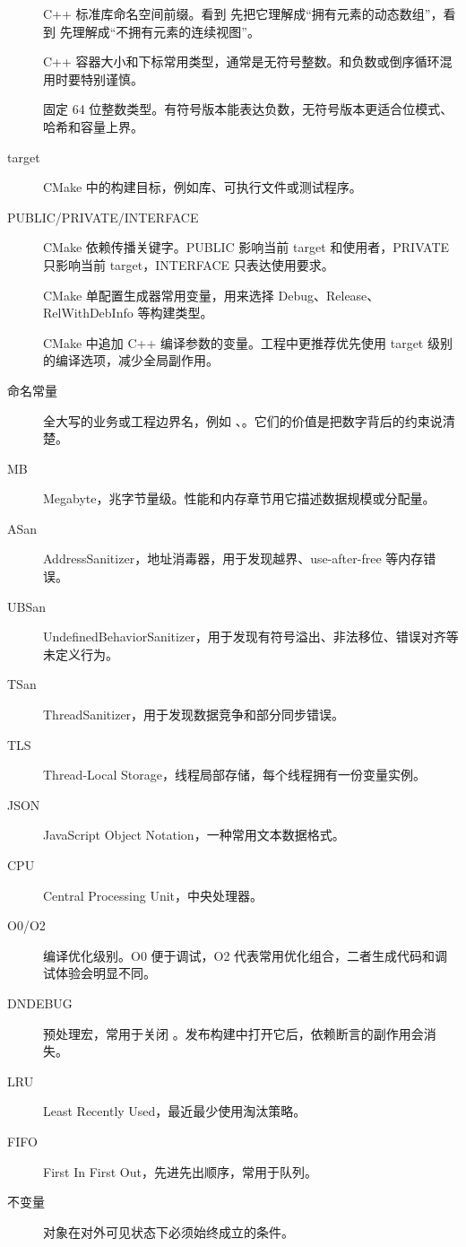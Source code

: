 \begin{description}
  \item[] C++ 标准库命名空间前缀。看到  先把它理解成“拥有元素的动态数组”，看到  先理解成“不拥有元素的连续视图”。
  \item[] C++ 容器大小和下标常用类型，通常是无符号整数。和负数或倒序循环混用时要特别谨慎。
  \item[] 固定 64 位整数类型。有符号版本能表达负数，无符号版本更适合位模式、哈希和容量上界。
  \item[target] CMake 中的构建目标，例如库、可执行文件或测试程序。
  \item[PUBLIC/PRIVATE/INTERFACE] CMake 依赖传播关键字。PUBLIC 影响当前 target 和使用者，PRIVATE 只影响当前 target，INTERFACE 只表达使用要求。
  \item[] CMake 单配置生成器常用变量，用来选择 Debug、Release、RelWithDebInfo 等构建类型。
  \item[] CMake 中追加 C++ 编译参数的变量。工程中更推荐优先使用 target 级别的编译选项，减少全局副作用。
  \item[命名常量] 全大写的业务或工程边界名，例如 、。它们的价值是把数字背后的约束说清楚。
  \item[MB] Megabyte，兆字节量级。性能和内存章节用它描述数据规模或分配量。
  \item[ASan] AddressSanitizer，地址消毒器，用于发现越界、use-after-free 等内存错误。
  \item[UBSan] UndefinedBehaviorSanitizer，用于发现有符号溢出、非法移位、错误对齐等未定义行为。
  \item[TSan] ThreadSanitizer，用于发现数据竞争和部分同步错误。
  \item[TLS] Thread-Local Storage，线程局部存储，每个线程拥有一份变量实例。
  \item[JSON] JavaScript Object Notation，一种常用文本数据格式。
  \item[CPU] Central Processing Unit，中央处理器。
  \item[O0/O2] 编译优化级别。O0 便于调试，O2 代表常用优化组合，二者生成代码和调试体验会明显不同。
  \item[DNDEBUG] 预处理宏，常用于关闭 。发布构建中打开它后，依赖断言的副作用会消失。
  \item[LRU] Least Recently Used，最近最少使用淘汰策略。
  \item[FIFO] First In First Out，先进先出顺序，常用于队列。
  \item[不变量] 对象在对外可见状态下必须始终成立的条件。

\end{description}

